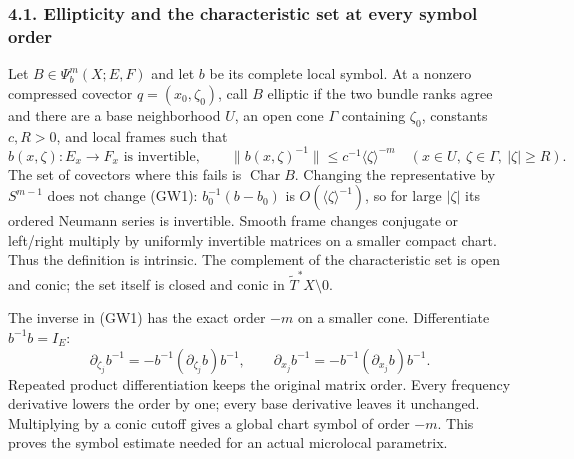 \documentclass[
  11pt,
]{article}
\begin{document}
\subsubsection{4.1. Ellipticity and the characteristic set at every
symbol
order}\label{ellipticity-and-the-characteristic-set-at-every-symbol-order}

Let \(B\in\Psi_b^m(X;E,F)\) and let \(b\) be its complete local symbol.
At a nonzero compressed covector \(q=(x_0,\zeta_0)\), call \(B\)
elliptic if the two bundle ranks agree and there are a base neighborhood
\(U\), an open cone \(\Gamma\) containing \(\zeta_0\), constants
\(c,R>0\), and local frames such that \[
 b(x,\zeta):E_x\to F_x\text{ is invertible},\qquad
 \|b(x,\zeta)^{-1}\|\le c^{-1}\langle\zeta\rangle^{-m}
 \quad(x\in U,\ \zeta\in\Gamma,\ |\zeta|\ge R).
 \tag{GW1}
\] The set of covectors where this fails is \(\operatorname{Char}B\).
Changing the representative by \(S^{m-1}\) does not change (GW1):
\(b_0^{-1}(b-b_0)\) is \(O(\langle\zeta\rangle^{-1})\), so for large
\(|\zeta|\) its ordered Neumann series is invertible. Smooth frame
changes conjugate or left/right multiply by uniformly invertible
matrices on a smaller compact chart. Thus the definition is intrinsic.
The complement of the characteristic set is open and conic; the set
itself is closed and conic in \(\widetilde T^*X\setminus0\).

The inverse in (GW1) has the exact order \(-m\) on a smaller cone.
Differentiate \(b^{-1}b=I_E\): \[
 \partial_{\zeta_j}b^{-1}
   =-b^{-1}(\partial_{\zeta_j}b)b^{-1},\qquad
 \partial_{x_j}b^{-1}
   =-b^{-1}(\partial_{x_j}b)b^{-1}.
 \tag{GW2}
\] Repeated product differentiation keeps the original matrix order.
Every frequency derivative lowers the order by one; every base
derivative leaves it unchanged. Multiplying by a conic cutoff gives a
global chart symbol of order \(-m\). This proves the symbol estimate
needed for an actual microlocal parametrix.
\end{document}
